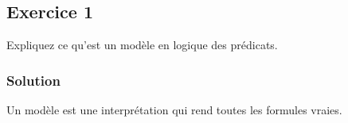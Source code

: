 \section{}








\subsection*{Exercice 1}
Expliquez ce qu'est un modèle en logique des prédicats. 

    \subsubsection*{Solution}
    
    Un modèle est une interprétation qui rend toutes les formules vraies.
    

